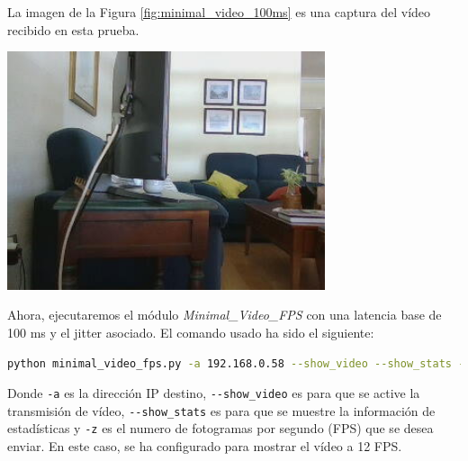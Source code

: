 \newpage
La imagen de la Figura \ref{fig:minimal_video_100ms} es una captura del vídeo recibido en esta prueba.
\begin{center}
  \includegraphics[width = 0.7\textwidth]{images/VideoRecibido5.1.png}
  \label{fig:minimal_video_100ms}
\end{center}

\newpage

Ahora, ejecutaremos el módulo \textit{Minimal\_Video\_FPS} con una latencia base de 100 ms y el jitter asociado. El comando usado ha sido el siguiente:

\begin{lstlisting}[language=bash, basicstyle=\ttfamily\scriptsize]
    python minimal_video_fps.py -a 192.168.0.58 --show_video --show_stats -z 12
\end{lstlisting}
Donde \verb|-a| es la dirección IP destino, \verb|--show_video| es para que se active la transmisión de vídeo, \verb|--show_stats| es para que se muestre la información de estadísticas y \verb|-z| es el numero de fotogramas por segundo (FPS) que se desea enviar. En este caso, se ha configurado para mostrar el vídeo a 12 FPS.
\vspace{\baselineskip}

